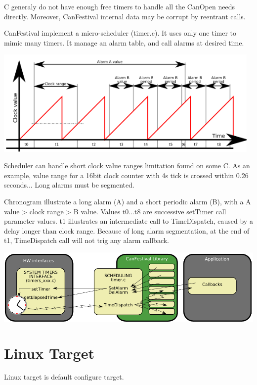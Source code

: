 \documentclass[12pt,twoside]{article}
\begin{document}
{\textmu}C generaly do not have enough free timers to handle all the
CanOpen needs directly. Moreover, CanFestival internal data may be
corrupt by reentrant calls. 

CanFestival implement a micro{}-scheduler (timer.c). It uses only one
timer to mimic many timers. It manage an alarm table, and call alarms
at desired time.

\begin{center}
   \includegraphics[width=13cm]{Pictures/100000000000022C000000DEDAD2140C.png}
\end{center}

Scheduler can handle short clock value ranges limitation found on some
{\textmu}C. As an example, value range for a 16bit clock counter with
4{\textmu}s tick is crossed within 0.26 seconds... Long alarms must be
segmented.

Chronogram illustrate a long alarm (A) and a short periodic alarm (B),
with a A value {\textgreater} clock range {\textgreater} B value.
Values t0...t8 are successive setTimer call parameter values. t1
illustrates an intermediate call to TimeDispatch, caused by a delay
longer than clock range. Because of long alarm segmentation, at the end
of t1, TimeDispatch call will not trig any alarm callback.

\begin{center}
   \includegraphics[width=18cm]{Pictures/1000000000000396000000FFC42573DA.png}
\end{center}

\section{Linux Target}
Linux target is default configure target.
\end{document}

